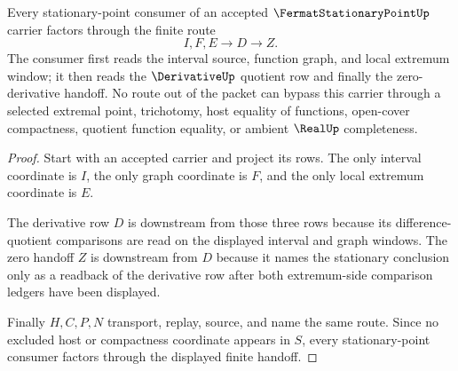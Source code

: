 \begin{theorem}
\label{thm:fermat-stationary-point-derivative-zero-handoff}
Every stationary-point consumer of an accepted $\FermatStationaryPointUp$ carrier factors through the finite route
$$
I,F,E \longrightarrow D \longrightarrow Z.
$$
The consumer first reads the interval source, function graph, and local extremum window; it then reads the $\DerivativeUp$ quotient row and finally the zero-derivative handoff. No route out of the packet can bypass this carrier through a selected extremal point, trichotomy, host equality of functions, open-cover compactness, quotient function equality, or ambient $\RealUp$ completeness.
\end{theorem}
\begin{proof}
Start with an accepted carrier and project its rows. The only interval coordinate is $I$, the only graph coordinate is $F$, and the only local extremum coordinate is $E$.

The derivative row $D$ is downstream from those three rows because its difference-quotient comparisons are read on the displayed interval and graph windows. The zero handoff $Z$ is downstream from $D$ because it names the stationary conclusion only as a readback of the derivative row after both extremum-side comparison ledgers have been displayed.

Finally $H,C,P,N$ transport, replay, source, and name the same route. Since no excluded host or compactness coordinate appears in $S$, every stationary-point consumer factors through the displayed finite handoff.
\end{proof}


\begin{closurestatus}{\FermatStationaryPointUp}
  \theoryclosure{\seedClosure}
  \formalstatus{\unformalizedV}
\end{closurestatus}
